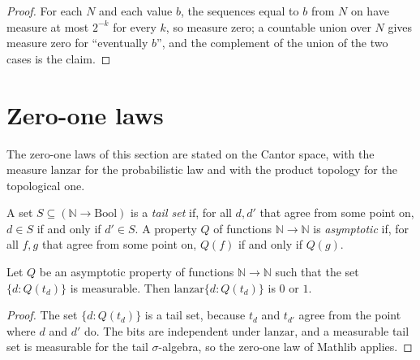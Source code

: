 \begin{proof}
  \leanok
  For each $N$ and each value $b$, the sequences equal to $b$ from $N$ on have measure at most $2^{-k}$ for every $k$,
  so measure zero; a countable union over $N$ gives measure zero for ``eventually $b$'', and the complement of the
  union of the two cases is the claim.
\end{proof}

\section{Zero-one laws}
\label{sec:infinite-zero-one}

The zero-one laws of this section are stated on the Cantor space, with the measure $\mathrm{lanzar}$ for the
probabilistic law and with the product topology for the topological one.

\begin{definition}
  \label{def:infinite-cola}
  \leanok
  \own{}
  A set $S \subseteq (\mathbb{N} \to \mathrm{Bool})$ is a \emph{tail set} if, for all $d, d'$ that agree from some point
  on, $d \in S$ if and only if $d' \in S$. A property $Q$ of functions $\mathbb{N} \to \mathbb{N}$ is \emph{asymptotic} if,
  for all $f, g$ that agree from some point on, $Q(f)$ if and only if $Q(g)$.
\end{definition}

\begin{theorem}
  \label{thm:infinite-cero-uno-costos}
  \leanok
  Let $Q$ be an asymptotic property of functions $\mathbb{N} \to \mathbb{N}$ such that the set
  $\{d : Q(t_d)\}$ is measurable. Then $\mathrm{lanzar}\{d : Q(t_d)\}$ is $0$ or $1$.
\end{theorem}

\begin{proof}
  \leanok
  The set $\{d : Q(t_d)\}$ is a tail set, because $t_d$ and $t_{d'}$ agree from the point where $d$ and $d'$ do. The bits
  are independent under $\mathrm{lanzar}$, and a measurable tail set is measurable for the tail $\sigma$-algebra, so
  the zero-one law of Mathlib applies.
\end{proof}

